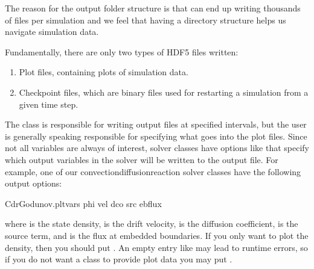 \documentclass[letterpaper,10pt,english]{sphinxmanual}
\begin{document}
The reason for the output folder structure is that  can end up writing thousands of files per simulation and we feel that having a directory structure helps us navigate simulation data.

Fundamentally, there are only two types of HDF5 files written:
\begin{enumerate}
%
\item {} 
Plot files, containing plots of simulation data.

\item {} 
Checkpoint files, which are binary files used for restarting a simulation from a given time step.

\end{enumerate}

The {\hyperref[\detokenize{Source/Driver:chap-driver}]{}} class is responsible for writing output files at specified intervals, but the user is generally speaking responsible for specifying what goes into the plot files.
Since not all variables are always of interest, solver classes have options like  that specify which output variables in the solver will be written to the output file.
For example, one of our convection\sphinxhyphen{}diffusion\sphinxhyphen{}reaction solver classes have the following output options:

\begin{sphinxVerbatim}[commandchars=\\\{\},formatcom=\scriptsize]
CdrGodunov.plt\PYGZus{}vars  phi vel dco src ebflux 
\end{sphinxVerbatim}

where  is the state density,  is the drift velocity,  is the diffusion coefficient,  is the source term, and  is the flux at embedded boundaries.
If you only want to plot the density, then you should put .
An empty entry like  may lead to run\sphinxhyphen{}time errors, so if you do not want a class to provide plot data you may put .
\end{document}

